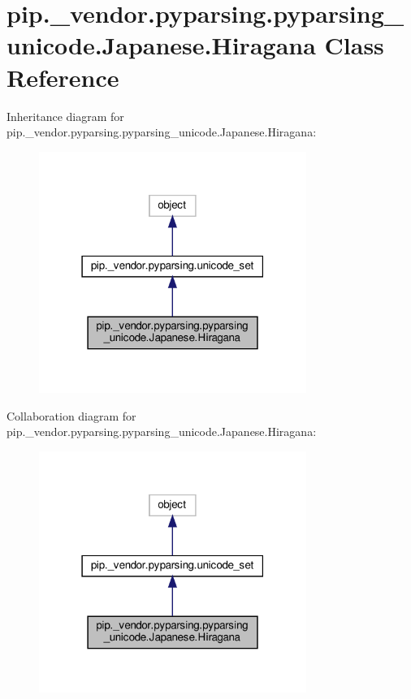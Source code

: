 \hypertarget{classpip_1_1__vendor_1_1pyparsing_1_1pyparsing__unicode_1_1Japanese_1_1Hiragana}{}\section{pip.\+\_\+vendor.\+pyparsing.\+pyparsing\+\_\+unicode.\+Japanese.\+Hiragana Class Reference}
\label{classpip_1_1__vendor_1_1pyparsing_1_1pyparsing__unicode_1_1Japanese_1_1Hiragana}


Inheritance diagram for pip.\+\_\+vendor.\+pyparsing.\+pyparsing\+\_\+unicode.\+Japanese.\+Hiragana\+:
\nopagebreak
\begin{figure}[H]
\begin{center}
\leavevmode
\includegraphics[width=247pt]{classpip_1_1__vendor_1_1pyparsing_1_1pyparsing__unicode_1_1Japanese_1_1Hiragana__inherit__graph}
\end{center}
\end{figure}


Collaboration diagram for pip.\+\_\+vendor.\+pyparsing.\+pyparsing\+\_\+unicode.\+Japanese.\+Hiragana\+:
\nopagebreak
\begin{figure}[H]
\begin{center}
\leavevmode
\includegraphics[width=247pt]{classpip_1_1__vendor_1_1pyparsing_1_1pyparsing__unicode_1_1Japanese_1_1Hiragana__coll__graph}
\end{center}
\end{figure}
